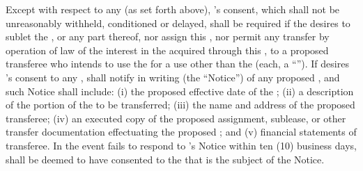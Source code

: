 Except with respect to any \permittedTransfer (as set forth above), \lessor's consent, which shall not be unreasonably withheld, conditioned or delayed, shall be required if the \lessee desires to sublet the \premises, or any part thereof, nor assign this \lease, nor permit any transfer by operation of law of the interest in the \premises acquired through this \lease, to a proposed transferee who intends to use the \premises for a use other than the \permittedUse (each, a ``''). If \lessee desires \lessor's consent to any \consentTransfer, \lessee shall notify \lessor in writing (the ``\consentTransfer Notice'') of any proposed \consentTransfer, and such \consentTransfer Notice shall include: (i) the proposed effective date of the \consentTransfer; (ii) a description of the portion of the \premises to be transferred; (iii) the name and address of the proposed transferee; (iv) an executed copy of the proposed assignment, sublease, or other transfer documentation effectuating the proposed \consentTransfer; and (v) financial statements of transferee. In the event \lessor fails to respond to \lessee's \consentTransfer Notice within ten (10) business days, \lessor shall be deemed to have consented to the \consentTransfer that is the subject of the \consentTransfer Notice.
